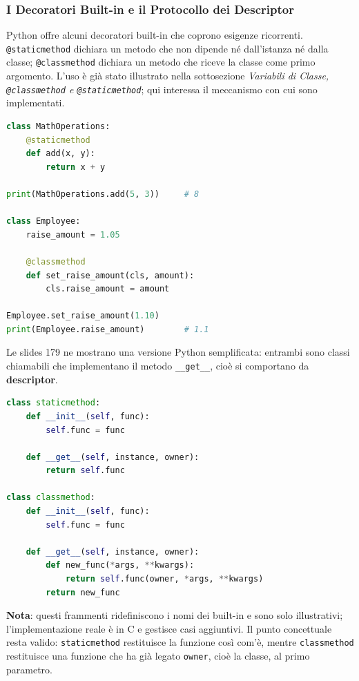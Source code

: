 \documentclass[12pt]{extarticle}
\begin{document}
\subsubsection{I Decoratori Built-in e il Protocollo dei Descriptor}

\noindent Python offre alcuni decoratori built-in che coprono esigenze ricorrenti. \texttt{@staticmethod} dichiara un metodo che non dipende né dall'istanza né dalla classe; \texttt{@classmethod} dichiara un metodo che riceve la classe come primo argomento. L'uso è già stato illustrato nella sottosezione \emph{Variabili di Classe, \texttt{@classmethod} e \texttt{@staticmethod}}; qui interessa il meccanismo con cui sono implementati.

\begin{lstlisting}[language=Python]
class MathOperations:
    @staticmethod
    def add(x, y):
        return x + y

print(MathOperations.add(5, 3))     # 8

class Employee:
    raise_amount = 1.05

    @classmethod
    def set_raise_amount(cls, amount):
        cls.raise_amount = amount

Employee.set_raise_amount(1.10)
print(Employee.raise_amount)        # 1.1
\end{lstlisting}

\noindent Le slides 179 ne mostrano una versione Python semplificata: entrambi sono classi chiamabili che implementano il metodo \texttt{\_\_get\_\_}, cioè si comportano da \textbf{descriptor}.

\begin{lstlisting}[language=Python]
class staticmethod:
    def __init__(self, func):
        self.func = func

    def __get__(self, instance, owner):
        return self.func

class classmethod:
    def __init__(self, func):
        self.func = func

    def __get__(self, instance, owner):
        def new_func(*args, **kwargs):
            return self.func(owner, *args, **kwargs)
        return new_func
\end{lstlisting}

\noindent \textbf{Nota}: questi frammenti ridefiniscono i nomi dei built-in e sono solo illustrativi; l'implementazione reale è in C e gestisce casi aggiuntivi. Il punto concettuale resta valido: \texttt{staticmethod} restituisce la funzione così com'è, mentre \texttt{classmethod} restituisce una funzione che ha già legato \texttt{owner}, cioè la classe, al primo parametro.
\end{document}
